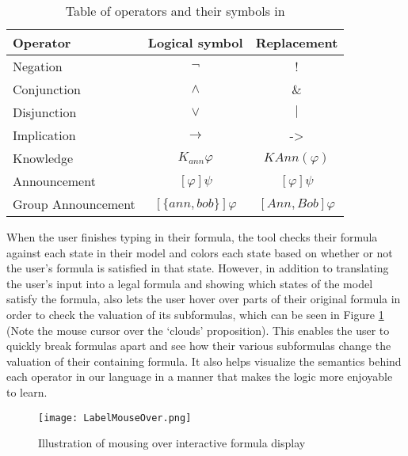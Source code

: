 \begin{table}[H]
\centering
\begin{tabular}{@{}lcc@{}}
\toprule
Operator           & Logical symbol & Replacement     \\  \midrule
Negation           &       $\neg$         & !               \\
Conjunction       &      $\wedge$          & $\&$              \\
Disjunction        &    $\vee$        & $|$               \\
Implication        &       $\rightarrow$       & -\textgreater{} \\
Knowledge         &        $K_{ann}\varphi$        & $KAnn(\varphi)$            \\
Announcement   &       $[\varphi]\psi$         &  $[\varphi]\psi$     \\
Group Announcement &  $[\{ann,bob\}]\varphi$  & $[Ann,Bob]\varphi$ \\ \bottomrule
\end{tabular}%
\caption{Table of operators and their symbols in \cname{}}
\label{tbl:symbolReplacements}
\end{table}



When the user finishes typing in their formula, the tool checks their formula against each state in their model and colors each state based on whether or not the user's formula is satisfied in that state. However, in addition to translating the user's input into a legal formula and showing which states of the model satisfy the formula, \cname{} also lets the user hover over parts of their original formula in order to check the valuation of its subformulas, which can be seen in Figure \ref{fig:labelHover} (Note the mouse cursor over the `clouds' proposition). This enables the user to quickly break formulas apart and see how their various subformulas change the valuation of their containing formula. It also helps visualize the semantics behind each operator in our language in a manner that makes the logic more enjoyable to learn. 

\begin{figure}[H]
	\texttt{[image: LabelMouseOver.png]}
	\caption{Illustration of mousing over interactive formula display}	
	\label{fig:labelHover}
\end{figure}


